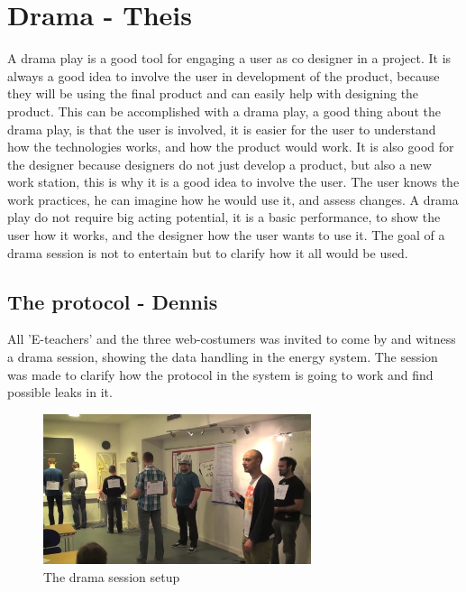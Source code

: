 \section{Drama - Theis}
A drama play is a good tool for engaging a user as co designer in a project. It is always a good idea to involve the user in development of the product, because they will be using the final product and can easily help with designing the product. This can be accomplished with a drama play, a good thing about the drama play, is that the user is involved, it is easier for the user to understand how the technologies works, and how the product would work. It is also good for the designer because designers do not just develop a product, but also a new work station, this is why it is a good idea to involve the user. The user knows the work practices, he can imagine how he would use it, and assess changes. A drama play do not require big acting potential, it is a basic performance, to show the user how it works, and the designer how the user wants to use it. The goal of a drama session is not to entertain but to clarify how it all would be used.

\subsection{The protocol - Dennis}
All 'E-teachers' and the three web-costumers was invited to come by and witness a drama session, showing the data handling in the energy system. The session was made to clarify how the protocol in the system is going to work and find possible leaks in it. 
\begin{figure}[H]
	\center
		\includegraphics[width=0.7\textwidth]{images/drama_setup.png}
   	\caption{The drama session setup}
   	\label{fig:drama_session_setup}
\end{figure}

